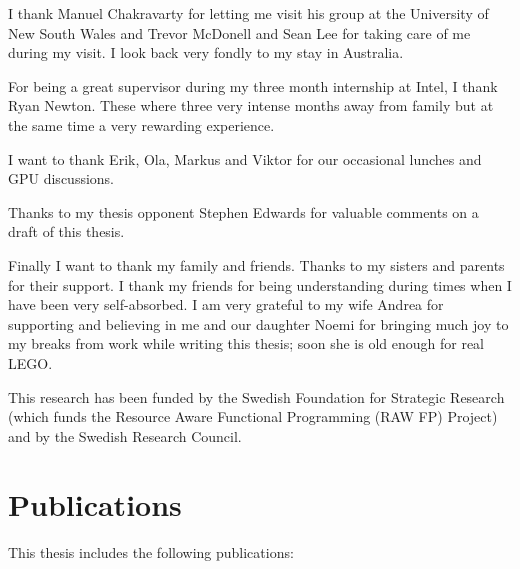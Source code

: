 \documentclass[a4paper]{book}
\begin{document}
I thank Manuel Chakravarty for letting me visit his group at the University of New South Wales 
and Trevor McDonell and Sean Lee for taking care of me during my visit. I look back 
very fondly to my stay in Australia. 

For being a great supervisor during my three month internship at Intel, I thank Ryan Newton. 
These where three very intense months away from family but at the same time a very rewarding 
experience. 

I want to thank Erik, Ola, Markus and Viktor for our occasional lunches and GPU discussions. 

Thanks to my thesis opponent Stephen Edwards for valuable comments on a draft of this thesis. 

Finally I want to thank my family and friends. Thanks to my sisters and parents for their support.
I thank my friends for being understanding during times when I have been very self-absorbed. 
I am very grateful to my wife Andrea for supporting and believing in me and our daughter Noemi 
for bringing much joy to my breaks from work while writing this thesis; soon she is old enough 
for real LEGO. 

\vspace{5mm}
\noindent This research has been funded by the Swedish Foundation for
Strategic Research (which funds the Resource Aware Functional 
Programming (RAW FP) Project) and by the Swedish Research Council.

\clearpage

\section*{Publications}

This thesis includes the following publications: 
\end{document}
